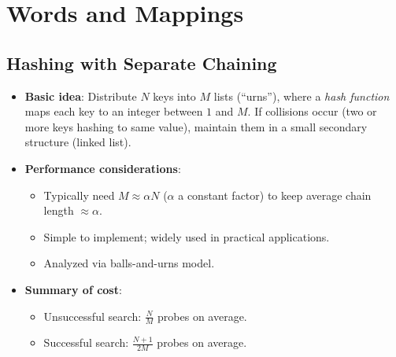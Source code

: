 \documentclass[11pt,letterpaper]{article}
\begin{document}
\section{Words and Mappings}

\subsection{Hashing with Separate Chaining}
\begin{itemize}
  \item \textbf{Basic idea}: Distribute $N$ keys into $M$ lists (``urns''), where a \emph{hash function} maps each key to an integer between $1$ and $M$. If collisions occur (two or more keys hashing to same value), maintain them in a small secondary structure (linked list).
  \item \textbf{Performance considerations}:
    \begin{itemize}
      \item Typically need $M \approx \alpha N$ ($\alpha$ a constant factor) to keep average chain length $\approx \alpha$.
      \item Simple to implement; widely used in practical applications.
      \item Analyzed via balls-and-urns model.
    \end{itemize}
  \item \textbf{Summary of cost}:
    \begin{itemize}
      \item Unsuccessful search: $\frac{N}{M}$ probes on average.
      \item Successful search: $\frac{N+1}{2M}$ probes on average.
    \end{itemize}
\end{itemize}

\end{document}
